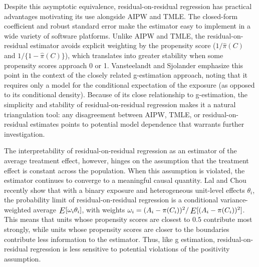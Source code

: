 \documentclass[12pt]{article}
\newcommand{\E}{\mathop{\vcenter{\hbox{\relsize{+1}$E$}}}}
\begin{document}
Despite this asymptotic equivalence, residual-on-residual regression has practical advantages motivating its use alongside AIPW and TMLE. The closed-form coefficient and robust standard error make the estimator easy to implement in a wide variety of software platforms. Unlike AIPW and TMLE, the residual-on-residual estimator avoids explicit weighting by the propensity score ($1/\hat\pi(C)$ and $1/\{1 - \hat\pi(C)\}$), which translates into greater stability when some propensity scores approach 0 or 1. Vansteelandt and Sjolander emphasize this point in the context of the closely related g-estimation approach, noting that it requires only a model for the conditional expectation of the exposure (as opposed to its conditional density).\cite{VansteelandtSjolander2016} Because of its close relationship to g-estimation, the simplicity and stability of residual-on-residual regression makes it a natural triangulation tool: any disagreement between AIPW, TMLE, or residual-on-residual estimates points to potential model dependence that warrants further investigation.

The interpretability of residual-on-residual regression as an estimator of the average treatment effect, however, hinges on the assumption that the treatment effect is constant across the population. When this assumption is violated, the estimator continues to converge to a meaningful causal quantity. Lal and Chou recently show that with a binary exposure and heterogeneous unit-level effects $\theta_i$, the probability limit of residual-on-residual regression is a conditional variance-weighted average $\E[\omega_i \theta_i]$, with weights $\omega_i = (A_i - \pi(C_i))^2 / \E[(A_i - \pi(C_i))^2]$. This means that units whose propensity scores are closest to $0.5$ contribute most strongly, while units whose propensity scores are closer to the boundaries contribute less information to the estimator.\cite{LalChou2026} Thus, like g estimation, residual-on-residual regression is less sensitive to potential violations of the positivity assumption. 
\end{document}
